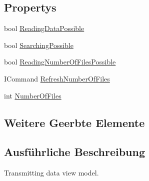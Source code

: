 \subsection*{Propertys}
\begin{DoxyCompactItemize}
\item 
bool \mbox{\hyperlink{classmy_m_d_1_1_view_model_1_1_send_data_tab_view_model_1_1_transmitting_data_view_model_ade15b9cbbab522230750f0589142dcce}{Reading\+Data\+Possible}}
\item 
bool \mbox{\hyperlink{classmy_m_d_1_1_view_model_1_1_send_data_tab_view_model_1_1_transmitting_data_view_model_a303ab750ac74c934f8c02b392702a2fa}{Searching\+Possible}}
\item 
bool \mbox{\hyperlink{classmy_m_d_1_1_view_model_1_1_send_data_tab_view_model_1_1_transmitting_data_view_model_af15db4a7f5f76480197d7c6ee36f5fc2}{Reading\+Number\+Of\+Files\+Possible}}
\item 
I\+Command \mbox{\hyperlink{classmy_m_d_1_1_view_model_1_1_send_data_tab_view_model_1_1_transmitting_data_view_model_a65eb7fa5e755ed75f94d498122df50b7}{Refresh\+Number\+Of\+Files}}
\item 
int \mbox{\hyperlink{classmy_m_d_1_1_view_model_1_1_send_data_tab_view_model_1_1_transmitting_data_view_model_ab2d1beaf9cb1e986d607af394ab3f6a7}{Number\+Of\+Files}}
\end{DoxyCompactItemize}
\subsection*{Weitere Geerbte Elemente}


\subsection{Ausführliche Beschreibung}
Transmitting data view model. 



